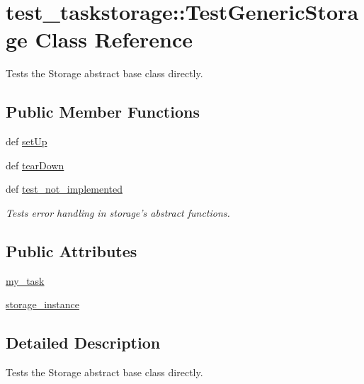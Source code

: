 \hypertarget{classtest__taskstorage_1_1TestGenericStorage}{
\section{test\-\_\-taskstorage\-:\-:\-Test\-Generic\-Storage \-Class \-Reference}
\label{classtest__taskstorage_1_1TestGenericStorage}
}


\-Tests the \-Storage abstract base class directly.  


\subsection*{\-Public \-Member \-Functions}
\begin{DoxyCompactItemize}
\item 
def \hyperlink{classtest__taskstorage_1_1TestGenericStorage_a64b019d0c45401c0a5d5bba7c8af279f}{set\-Up}
\item 
def \hyperlink{classtest__taskstorage_1_1TestGenericStorage_a4d9fdf15f42f17d40e594ba615a7d1aa}{tear\-Down}
\item 
def \hyperlink{classtest__taskstorage_1_1TestGenericStorage_ac5ba583c94f300d11eac69962a72003b}{test\-\_\-not\-\_\-implemented}
\begin{DoxyCompactList}\small\item\em \-Tests error handling in storage's abstract functions. \end{DoxyCompactList}\end{DoxyCompactItemize}
\subsection*{\-Public \-Attributes}
\begin{DoxyCompactItemize}
\item 
\hyperlink{classtest__taskstorage_1_1TestGenericStorage_a8ab0dfe56db3b3522240af6aa43de0d2}{my\-\_\-task}
\item 
\hyperlink{classtest__taskstorage_1_1TestGenericStorage_ac596a1ade6c8e90762704557da93d4bd}{storage\-\_\-instance}
\end{DoxyCompactItemize}


\subsection{\-Detailed \-Description}
\-Tests the \-Storage abstract base class directly. 

